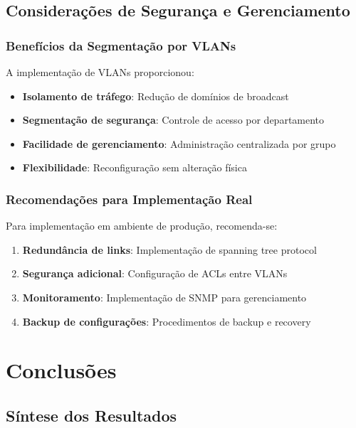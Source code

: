 \subsection{Considerações de Segurança e Gerenciamento}

\subsubsection{Benefícios da Segmentação por VLANs}

A implementação de VLANs proporcionou:

\begin{itemize}
    \item \textbf{Isolamento de tráfego}: Redução de domínios de broadcast
    \item \textbf{Segmentação de segurança}: Controle de acesso por departamento
    \item \textbf{Facilidade de gerenciamento}: Administração centralizada por grupo
    \item \textbf{Flexibilidade}: Reconfiguração sem alteração física
\end{itemize}

\subsubsection{Recomendações para Implementação Real}

Para implementação em ambiente de produção, recomenda-se:

\begin{enumerate}
    \item \textbf{Redundância de links}: Implementação de spanning tree protocol
    \item \textbf{Segurança adicional}: Configuração de ACLs entre VLANs
    \item \textbf{Monitoramento}: Implementação de SNMP para gerenciamento
    \item \textbf{Backup de configurações}: Procedimentos de backup e recovery
\end{enumerate}

\section{Conclusões}

\subsection{Síntese dos Resultados}

